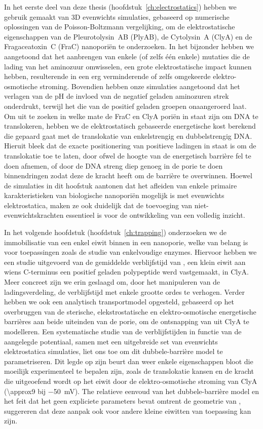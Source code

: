 In het eerste deel van deze thesis (hoofdstuk~\ref{ch:electrostatics}) hebben we gebruik gemaakt van 3D
evenwichts simulaties, gebaseerd op numerische oplossingen van de Poisson-Boltzmann vergelijking, om de
elektrostatische eigenschappen van de Pleurotolysin~AB (PlyAB), de Cytolysin~A (ClyA) en de Fragaceatoxin~C
(FraC) nanopori\"{e}n te onderzoeken. In het bijzonder hebben we aangetoond dat het aanbrengen van enkele (of
zelfs \'{e}\'{e}n enkele) mutaties die de lading van het aminozuur omwisselen, een grote elektrostatische
impact kunnen hebben, resulterende in een erg verminderende of zelfs omgekeerde elektro-osmotische stroming.
Bovendien hebben onze simulaties aangetoond dat het verlagen van de pH de invloed van de negatief geladen
aminozuren strek onderdrukt, terwijl het die van de positief geladen groepen onaangeroerd laat. Om uit te
zoeken in welke mate de FraC en ClyA pori\"{e}n in staat zijn om DNA te translokeren, hebben we de
elektrostatisch gebaseerde energetische kost berekend die gepaard gaat met de translokatie van enkelstrengig
en dubbelstrengig DNA. Hieruit bleek dat de exacte positionering van positieve ladingen in staat is om de
translokatie toe te laten, door ofwel de hoogte van de energetisch barri\`{e}re fel te doen afnemen, of door
de DNA streng diep genoeg in de porie te doen binnendringen zodat deze de kracht heeft om de barri\`{e}re te
overwinnen. Hoewel de simulaties in dit hoofstuk aantonen dat het afleiden van enkele primaire
karakteristieken van biologische nanopori\"{e}n mogelijk is met evenwichts elektrostatica, maken ze ook
duidelijk dat de toevoeging van niet-evenwichtskrachten essentieel is voor de ontwikkeling van een volledig
inzicht.

In het volgende hoofdstuk (hoofdstuk~\ref{ch:trapping}) onderzoeken we de immobilisatie van een enkel eiwit
binnen in een nanoporie, welke van belang is voor toepassingen zoals de studie van enkelvoudige enzymes.
Hiervoor hebben we een studie uitgevoerd van de gemiddelde verblijfstijd van \DHFRt{}, een klein eiwit aan
wiens C-terminus een positief geladen polypeptide werd vastgemaakt, in ClyA. Meer concreet zijn we erin
geslaagd om, door het manipuleren van de ladingsverdeling, de verblijfstijd met enkele grootte ordes te
verhogen. Verder hebben we ook een analytisch transportmodel opgesteld, gebaseerd op het overbruggen van de
sterische, elekstrostatische en elektro-osmotische energetische barri\`{e}res aan beide uiteinden van de
porie, om de ontsnapping van \DHFRt{} uit ClyA te modelleren. Een systematische studie van de verblijfstijden
in functie van de aangelegde potentiaal, samen met een uitgebreide set van evenwichts elektrostatica
simulaties, liet ons toe om dit dubbele-barri\`{e}re model te parametriseren. Dit legde op zijn beurt dan weer
enkele eigenschappen bloot die moeilijk experimenteel te bepalen zijn, zoals de translokatie kansen en de
kracht die uitgeoefend wordt op het eiwit door de elektro-osmotische stroming van ClyA (\SI{\approx9}{\pN} bij
\SI{-50}{\mV}). The relatieve eenvoud van het dubbele-barri\`{e}re model en het feit dat het geen expliciete
parameters bevat omtrent de geometrie van \DHFRt{}, suggereren dat deze aanpak ook voor andere kleine eiwitten
van toepassing kan zijn.

